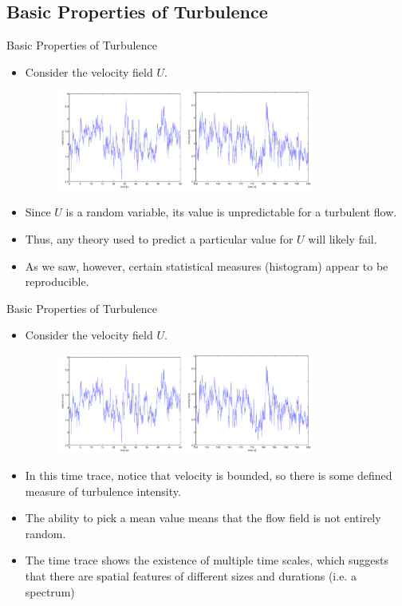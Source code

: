 \subsection{Basic Properties of Turbulence}
\begin{frame}{Basic Properties of Turbulence}
\begin{itemize}
  	\item Consider the velocity field $U$.
  	\begin{figure}
  		\includegraphics[width=0.8\textwidth]{timetrace1}
  	\end{figure}
  	\item Since $U$ is a random variable, its value is unpredictable for a turbulent flow.
  	\item Thus, any theory used to predict a particular value for $U$ will likely fail.
  	\item As we saw, however, certain statistical measures (histogram) appear to be reproducible. 
  \end{itemize}
\end{frame}

\begin{frame}{Basic Properties of Turbulence}
\begin{itemize}
  	\item Consider the velocity field $U$.
  	\begin{figure}
  		\includegraphics[width=0.8\textwidth]{timetrace1}
  	\end{figure}
  	\item In this time trace, notice that velocity is bounded, so there is some defined measure of turbulence intensity.
  	\item The ability to pick a mean value means that the flow field is not entirely random.
  	\item The time trace shows the existence of multiple time scales, which suggests that there are spatial features of different sizes and durations (i.e. a spectrum)
  \end{itemize}
\end{frame}
